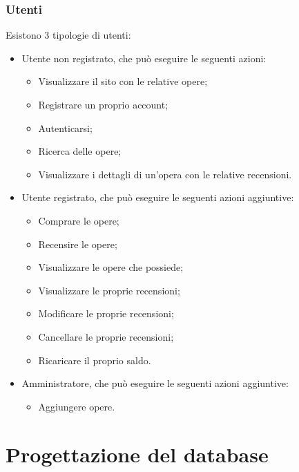 \documentclass[10pt]{article}
\begin{document}
\subsubsection{Utenti}
Esistono 3 tipologie di utenti:
\begin{itemize}
    \item Utente non registrato, che può eseguire le seguenti azioni:
    \begin{itemize}
        \item Visualizzare il sito con le relative opere;
        \item Registrare un proprio account;
        \item Autenticarsi;
        \item Ricerca delle opere;
        \item Visualizzare i dettagli di un'opera con le relative recensioni.
    \end{itemize}
    \item Utente registrato, che può eseguire le seguenti azioni aggiuntive:
    \begin{itemize}
        \item Comprare le opere;
        \item Recensire le opere;
        \item Visualizzare le opere che possiede;
        \item Visualizzare le proprie recensioni;
        \item Modificare le proprie recensioni;
        \item Cancellare le proprie recensioni;
        \item Ricaricare il proprio saldo.
    \end{itemize}
    \item Amministratore, che può eseguire le seguenti azioni aggiuntive:
    \begin{itemize}
        \item Aggiungere opere.
    \end{itemize}
\end{itemize}

\section{Progettazione del database}
\end{document}
